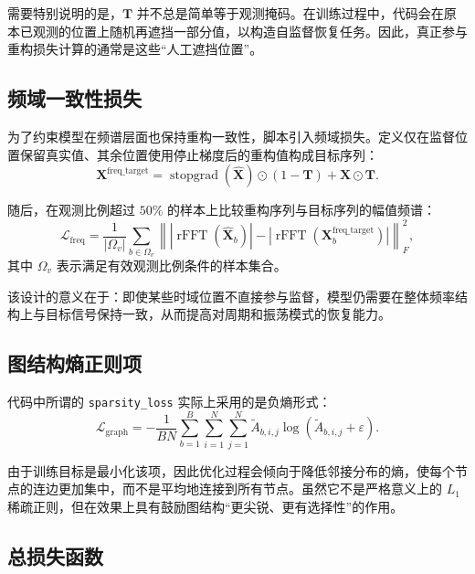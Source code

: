 需要特别说明的是，$\mathbf{T}$ 并不总是简单等于观测掩码。在训练过程中，代码会在原本已观测的位置上随机再遮挡一部分值，以构造自监督恢复任务。因此，真正参与重构损失计算的通常是这些“人工遮挡位置”。

\subsection{频域一致性损失}

为了约束模型在频谱层面也保持重构一致性，脚本引入频域损失。定义仅在监督位置保留真实值、其余位置使用停止梯度后的重构值构成目标序列：
\begin{equation}
    \mathbf{X}^{\mathrm{freq\_target}}
    =
    \operatorname{stopgrad}(\hat{\mathbf{X}})\odot(1-\mathbf{T})
    + \mathbf{X}\odot\mathbf{T}.
\end{equation}

随后，在观测比例超过 $50\%$ 的样本上比较重构序列与目标序列的幅值频谱：
\begin{equation}
    \mathcal{L}_{\mathrm{freq}}
    =
    \frac{1}{|\Omega_v|}
    \sum_{b \in \Omega_v}
    \left\|
        \left|\operatorname{rFFT}(\hat{\mathbf{X}}_b)\right|
        -
        \left|\operatorname{rFFT}(\mathbf{X}^{\mathrm{freq\_target}}_b)\right|
    \right\|_F^2,
\end{equation}
其中 $\Omega_v$ 表示满足有效观测比例条件的样本集合。

该设计的意义在于：即使某些时域位置不直接参与监督，模型仍需要在整体频率结构上与目标信号保持一致，从而提高对周期和振荡模式的恢复能力。

\subsection{图结构熵正则项}

代码中所谓的 \texttt{sparsity\_loss} 实际上采用的是负熵形式：
\begin{equation}
    \mathcal{L}_{\mathrm{graph}}
    =
    -
    \frac{1}{BN}
    \sum_{b=1}^{B}
    \sum_{i=1}^{N}
    \sum_{j=1}^{N}
    \tilde{A}_{b,i,j}\log(\tilde{A}_{b,i,j}+\varepsilon).
\end{equation}

由于训练目标是最小化该项，因此优化过程会倾向于降低邻接分布的熵，使每个节点的连边更加集中，而不是平均地连接到所有节点。虽然它不是严格意义上的 $L_1$ 稀疏正则，但在效果上具有鼓励图结构“更尖锐、更有选择性”的作用。

\subsection{总损失函数}

